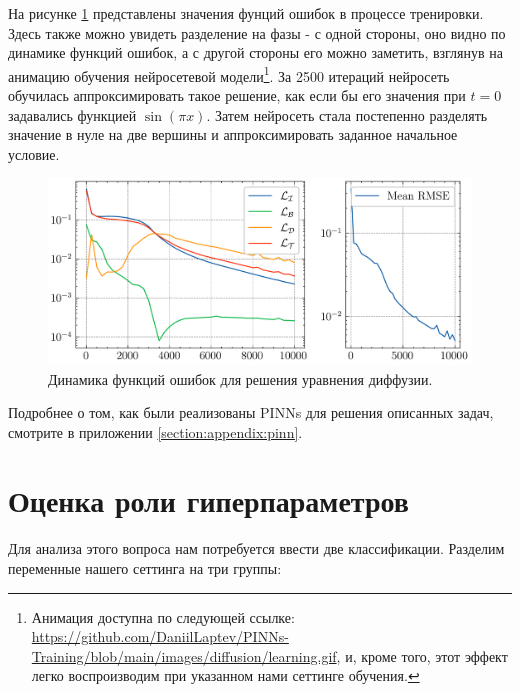 \documentclass[a4paper, 12pt]{article}
\begin{document}
На рисунке \ref{fig:diffusion:losses} представлены значения фунций ошибок в процессе тренировки. Здесь также можно увидеть разделение на фазы - с одной стороны, оно видно по динамике функций ошибок, а с другой стороны его можно заметить, взглянув на анимацию обучения нейросетевой модели\footnote{Анимация доступна по следующей ссылке: \url{https://github.com/DaniilLaptev/PINNs-Training/blob/main/images/diffusion/learning.gif}, и, кроме того, этот эффект легко воспроизводим при указанном нами сеттинге обучения.}. За 2500 итераций нейросеть обучилась аппроксимировать такое решение, как если бы его значения при $t=0$ задавались функцией $\sin(\pi x)$. Затем нейросеть стала постепенно разделять значение в нуле на две вершины и аппроксимировать заданное начальное условие.

\begin{figure}
    \centering
    \includegraphics{../images/diffusion/Loss report.png}
    \caption{Динамика функций ошибок для решения уравнения диффузии.}
    \label{fig:diffusion:losses}
\end{figure}

Подробнее о том, как были реализованы PINNs для решения описанных задач, смотрите в приложении \ref{section:appendix:pinn}.

\section{Оценка роли гиперпараметров} \label{section:hyperparameters}

Для анализа этого вопроса нам потребуется ввести две классификации. Разделим переменные нашего сеттинга на три группы:
\end{document}
